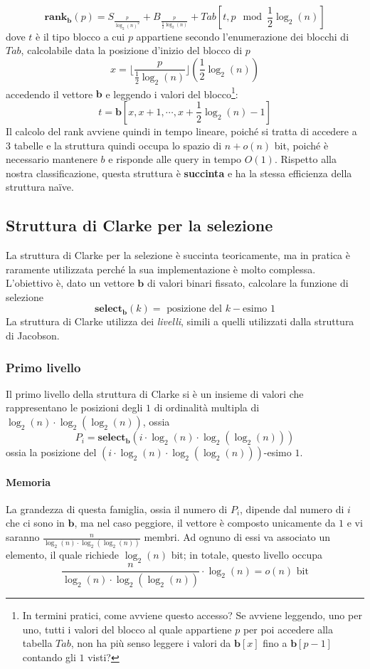 $$
	\mathbf{rank}_{\mathbf{b}}(p) = S_{\frac{p}{\log_2(n)^2}} + B_{\frac{p}{\frac{1}{2}\log_2(n)}}
	+ Tab[t, p \mod \frac{1}{2}\log_2(n)]
$$
dove $t$ è il tipo blocco a cui $p$ appartiene secondo l'enumerazione dei blocchi di
$Tab$, calcolabile data la posizione d'inizio del blocco di $p$
$$
	x = \lfloor \frac{p}{\frac{1}{2}\log_2(n)}\rfloor (\frac{1}{2}\log_2(n))
$$
accedendo il vettore $\mathbf{b}$ e leggendo i valori del blocco\footnote{
	In termini pratici, come avviene questo accesso? Se avviene leggendo,
	uno per uno, tutti i valori del blocco al quale appartiene $p$ per poi
	accedere alla tabella $Tab$, non ha più senso leggere i valori da
	$\mathbf{b}[x]$ fino a $\mathbf{b}[p-1]$ contando gli $1$ visti?
}:
$$
	t = \mathbf{b}[x, x +1, \cdots, x + \frac{1}{2} \log_2(n) -1 ]
$$
Il calcolo del rank avviene quindi in tempo lineare,
poiché si tratta di accedere a $3$ tabelle e la struttura quindi
occupa lo spazio di $n + o(n)$ bit, poiché è necessario mantenere $b$ e
risponde alle query in tempo $O(1)$. Rispetto alla nostra classificazione,
questa struttura è \textbf{succinta} e ha la stessa efficienza della struttura naïve.

\subsection{Struttura di Clarke per la selezione}
La struttura di Clarke per la selezione è succinta teoricamente, ma in pratica
è raramente utilizzata perché la sua implementazione è molto complessa.
L'obiettivo è, dato un vettore $\mathbf{b}$ di valori binari fissato, calcolare
la funzione di selezione
$$
	\mathbf{select_b}(k) = \text{ posizione del } k-\text{esimo } 1
$$
La struttura di Clarke utilizza dei \textit{livelli}, simili a quelli utilizzati
dalla struttura di Jacobson.

\subsubsection{Primo livello}
Il primo livello della struttura di Clarke si è un insieme
di valori che rappresentano le posizioni degli $1$ di ordinalità multipla di
$\log_2(n) \cdot \log_2(\log_2(n))$, ossia
$$
	P_i =  \mathbf{select_b}(i \cdot \log_2(n) \cdot \log_2(\log_2(n)))
$$
ossia la posizione del $(i \cdot \log_2(n) \cdot \log_2(\log_2(n)))$-esimo $1$.

\paragraph{Memoria}
La grandezza di questa famiglia, ossia il numero di $P_i$, dipende dal
numero di $i$ che ci sono in $\mathbf{b}$, ma nel caso peggiore, il vettore
è composto unicamente da $1$ e vi saranno $\frac{n}{\log_2(n) \cdot \log_2(\log_2(n))}$ membri.
Ad ognuno di essi va associato un elemento, il quale richiede $\log_2(n)$ bit;
in totale, questo livello occupa
$$
	\frac{n}{\log_2(n) \cdot \log_2(\log_2(n))} \cdot \log_2(n) = o(n) \text{ bit}
$$

